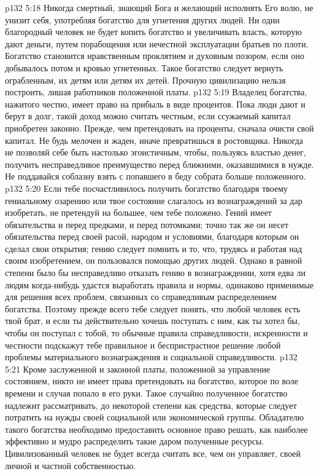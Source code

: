 \vs p132 5:18 \pc {}\bibnobreakspace Никогда смертный, знающий Бога и желающий исполнять Его волю, не унизит себя, употребляя богатство для угнетения других людей. Ни один благородный человек не будет копить богатство и увеличивать власть, которую дают деньги, путем порабощения или нечестной эксплуатации братьев по плоти. Богатство становится нравственным проклятием и духовным позором, если оно добывалось потом и кровью угнетенных. Такое богатство следует вернуть ограбленным, их детям или детям их детей. Прочную цивилизацию нельзя построить, лишая работников положенной платы.
\vs p132 5:19 \pc {}\bibnobreakspace Владелец богатства, нажитого честно, имеет право на прибыль в виде процентов. Пока люди дают и берут в долг, такой доход можно считать честным, если ссужаемый капитал приобретен законно. Прежде, чем претендовать на проценты, сначала очисти свой капитал. Не будь мелочен и жаден, иначе превратишься в ростовщика. Никогда не позволяй себе быть настолько эгоистичным, чтобы, пользуясь властью денег, получить несправедливое преимущество перед ближними, оказавшимися в нужде. Не поддавайся соблазну взять с попавшего в беду собрата больше положенного.
\vs p132 5:20 \pc {}\bibnobreakspace Если тебе посчастливилось получить богатство благодаря твоему гениальному озарению или твое состояние слагалось из вознаграждений за дар изобретать, не претендуй на большее, чем тебе положено. Гений имеет обязательства и перед предками, и перед потомками; точно так же он несет обязательства перед своей расой, народом и условиями, благодаря которым он сделал свои открытия; гению следует помнить и то, что, трудясь и работая над своим изобретением, он пользовался помощью других людей. Однако в равной степени было бы несправедливо отказать гению в вознаграждении, хотя едва ли людям когда\hyp{}нибудь удастся выработать правила и нормы, одинаково применимые для решения всех проблем, связанных со справедливым распределением богатства. Поэтому прежде всего тебе следует понять, что любой человек есть твой брат, и если ты действительно хочешь поступать с ним, как ты хотел бы, чтобы он поступал с тобой, то обычные правила справедливости, искренности и честности подскажут тебе правильное и беспристрастное решение любой проблемы материального вознаграждения и социальной справедливости.
\vs p132 5:21 \pc {}\bibnobreakspace Кроме заслуженной и законной платы, положенной за управление состоянием, никто не имеет права претендовать на богатство, которое по воле времени и случая попало в его руки. Такое случайно полученное богатство надлежит рассматривать, до некоторой степени как средства, которые следует потратить на нужды своей социальной или экономической группы. Обладателю такого богатства необходимо предоставить основное право решать, как наиболее эффективно и мудро распределить такие даром полученные ресурсы. Цивилизованный человек не будет всегда считать все, чем он управляет, своей личной и частной собственностью.
